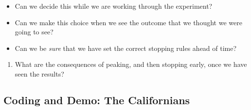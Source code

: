 \documentclass[
]{article}
\providecommand{\tightlist}{%
  \setlength{\itemsep}{0pt}\setlength{\parskip}{0pt}}
\theoremstyle{definition}
\theoremstyle{definition}
\theoremstyle{definition}
\theoremstyle{definition}
\theoremstyle{remark}
\begin{document}
\begin{itemize}
\tightlist
\item
  Can we decide this while we are working through the experiment?
\item
  Can we make this choice when we see the outcome that we thought we were going to see?
\item
  Can we be \emph{sure} that we have set the correct stopping rules ahead of time?
\end{itemize}

\begin{enumerate}
\def\labelenumi{\arabic{enumi}.}
\setcounter{enumi}{3}
\tightlist
\item
  What are the consequences of peaking, and then stopping early, once we have seen the results?
\end{enumerate}

\subsection{Coding and Demo: The Californians}\label{coding-and-demo-the-californians}
\end{document}
